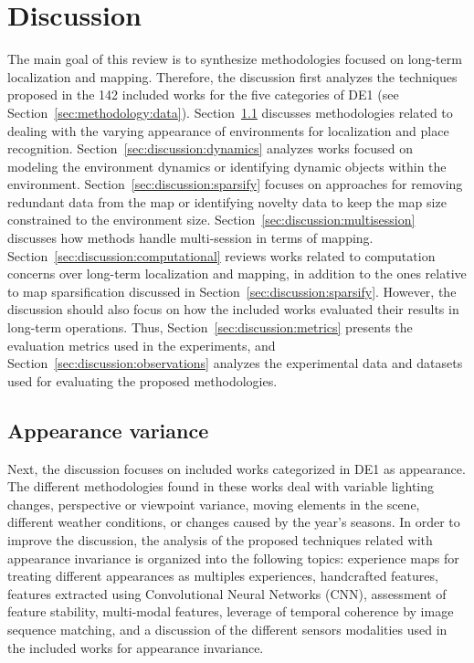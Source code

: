 \section{Discussion}
\label{sec:discussion}

The main goal of this review is to synthesize methodologies focused on long-term localization and mapping. Therefore, the discussion first analyzes the techniques proposed in the 142 included works for the five categories of DE1 (see Section~\ref{sec:methodology:data}). Section~\ref{sec:discussion:appearance} discusses methodologies related to dealing with the varying appearance of environments for localization and place recognition. Section~\ref{sec:discussion:dynamics} analyzes works focused on modeling the environment dynamics or identifying dynamic objects within the environment. Section~\ref{sec:discussion:sparsify} focuses on approaches for removing redundant data from the map or identifying novelty data to keep the map size constrained to the environment size. Section~\ref{sec:discussion:multisession} discusses how methods handle multi-session in terms of mapping. Section~\ref{sec:discussion:computational} reviews works related to computation concerns over long-term localization and mapping, in addition to the ones relative to map sparsification discussed in Section~\ref{sec:discussion:sparsify}. However, the discussion should also focus on how the included works evaluated their results in long-term operations. Thus, Section~\ref{sec:discussion:metrics} presents the evaluation metrics used in the experiments, and Section~\ref{sec:discussion:observations} analyzes the experimental data and datasets used for evaluating the proposed methodologies.





\subsection{Appearance variance}
\label{sec:discussion:appearance}

Next, the discussion focuses on included works categorized in DE1 as appearance. The different methodologies found in these works deal with variable lighting changes, perspective or viewpoint variance, moving elements in the scene, different weather conditions, or changes caused by the year's seasons.
In order to improve the discussion, the analysis of the proposed techniques related with appearance invariance is organized into the following topics: experience maps for treating different appearances as multiples experiences, handcrafted features, features extracted using Convolutional Neural Networks (CNN), assessment of feature stability, multi-modal features, leverage of temporal coherence by image sequence matching, and a discussion of the different sensors modalities used in the included works for appearance invariance.



